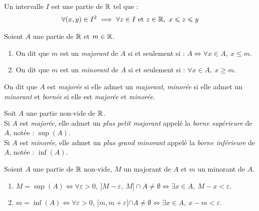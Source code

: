 \begin{definition}[Intervalle]
    Un intervalle $I$ est une partie de $\mathbb{R}$ tel que :
    \begin{align*}
        \forall (x, y) \in I^2 \implies \forall z \in I \text{ et } z \in \mathbb{R},\ x \leqslant z \leqslant y
    \end{align*}
\end{definition}

\begin{definition}
    Soient $A$ une partie de $\mathbb{R}$ et $m \in \mathbb{R}$.
    \begin{enumerate}
        \item On dit que $m$ est un \emph{majorant} de $A$ si et seulement si : $A \iff \forall x \in A,\ x \leq m$.
        \item On dit que $m$ est un \emph{minorant} de $A$ si et seulement si : $\forall x \in A,\ x \geq m$.
    \end{enumerate}
    On dit que $A$ est \emph{majorée} si elle admet un \emph{majorant}, \emph{minorée} si elle admet un \emph{minorant} et \emph{bornée} si elle est \emph{majorée} et \emph{minorée}.
\end{definition}

\begin{theorem}
    Soit $A$ une partie non-vide de $\mathbb{R}$. \\
    Si $A$ est \emph{majorée}, elle admet un \emph{plus petit majorant} appelé la \emph{borne supérieure} de $A$, notée : $\sup(A)$.
    \\
    Si $A$ est \emph{minorée}, elle admet un \emph{plus grand minorant} appelé la \emph{borne inférieure} de $A$, notée : $\inf(A)$.
\end{theorem}

\begin{proposition}
    Soient $A$ une partie de $\mathbb{R}$ non-vide, $M$ un majorant de $A$ et $m$ un minorant de $A$.  
    \begin{enumerate}
        \item $M = \sup(A) \iff \forall \varepsilon > 0,\ ]M - \varepsilon,\ M] \cap A \neq \emptyset \iff \exists x \in A,\ M - x < \varepsilon$.
        \item $m = \inf(A) \iff \forall \varepsilon > 0,\ [m, m + \varepsilon[ \cap A \neq \emptyset \iff \exists x \in A,\ x - m < \varepsilon$.
    \end{enumerate}
\end{proposition}